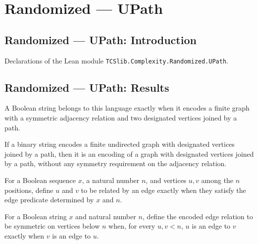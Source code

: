 \section{Randomized --- UPath}
\subsection*{Randomized --- UPath: Introduction}

Declarations of the Lean module \texttt{TCSlib.Complexity.Randomized.UPath}.

\subsection*{Randomized --- UPath: Results}

\begin{definition}
\label{Complexity.UPATH}
\leanok
{}
A Boolean string belongs to this language exactly when it encodes a finite graph with a
symmetric adjacency relation and two designated vertices joined by a path.
\end{definition}

\begin{theorem}
\label{Complexity.UPATH_subset_PATH}
\leanok
{}
If a binary string encodes a finite undirected graph with designated vertices joined by
a path, then it is an encoding of a graph with designated vertices joined by a path,
without any symmetry requirement on the adjacency relation.
\end{theorem}

\begin{definition}
\label{Complexity.inEdge}
\leanok
{}
For a Boolean sequence $x$, a natural number $n$, and vertices $u,v$ among the $n$
positions, define $u$ and $v$ to be related by an edge exactly when they satisfy the
edge predicate determined by $x$ and $n$.
\end{definition}

\begin{definition}
\label{Complexity.SymRest}
\leanok
{}
For a Boolean string $x$ and natural number $n$, define the encoded edge relation to be
symmetric on vertices below $n$ when, for every $u,v<n$, $u$ is an edge to $v$ exactly
when $v$ is an edge to $u$.
\end{definition}

